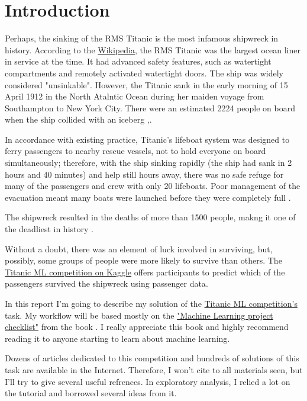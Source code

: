 \chapter{Introduction}
Perhaps, the sinking of the RMS Titanic is the most infamous shipwreck 
in history. According to the 
\href{https://en.wikipedia.org/wiki/Titanic}{Wikipedia}, 
the RMS Titanic was the largest ocean liner in service at the time. It
had advanced safety features, such as watertight compartments and 
remotely activated watertight doors. The ship was widely considered 
"unsinkable". However, the Titanic sank in the early morning of 15 April
1912 in the North Atalntic Ocean during her maiden voyage from 
Southampton to New York City. There were an estimated 2224 people on
board when the ship collided with an iceberg
\cite{titanic-wikipedia},\cite{sinking-of-the-titanic-wikipedia}.

In accordance with existing practice, Titanic's lifeboat system was 
designed to ferry passengers to nearby rescue vessels, not to hold 
everyone on board simultaneously; therefore, with the ship sinking 
rapidly (the ship had sank in 2 hours and 40 minutes) and help still 
hours away, there was no safe refuge for many of the passengers and 
crew with only 20 lifeboats. Poor management of the evacuation meant 
many boats were launched before they were completely full 
\cite{sinking-of-the-titanic-wikipedia}.

The shipwreck resulted in the deaths of more than 1500 people, makng it 
one of the deadliest in history \cite{sinking-of-the-titanic-wikipedia}.

Without a doubt, there was an element of luck involved in surviving, but,
possibly, some groups of people were more likely to survive than others.
The \href{https://www.kaggle.com/c/titanic}{Titanic ML competition on 
Kaggle} offers participants to predict which of the passengers survived 
the shipwreck using passenger data\cite{titanic-ml-competition}.

In this report I'm going to describe my solution of the
\href{https://www.kaggle.com/c/titanic}{Titanic ML competition's} task.
My workflow will be based mostly on the
\href{https://github.com/ageron/handson-ml/blob/master/ml-project-checklist.md}
{"Machine Learning project checklist"} from the book \cite{hands_on_ml}.
I really appreciate this book and highly recommend reading it to anyone 
starting to learn about machine learning. 

Dozens of articles dedicated to this competition and hundreds of solutions 
of this task are available in the Internet. Therefore, I won't cite to 
all materials seen, but I'll try to give several useful refrences.
In exploratory analysis, I relied a lot on the tutorial \cite{habr_titanic} 
and borrowed several ideas from it.